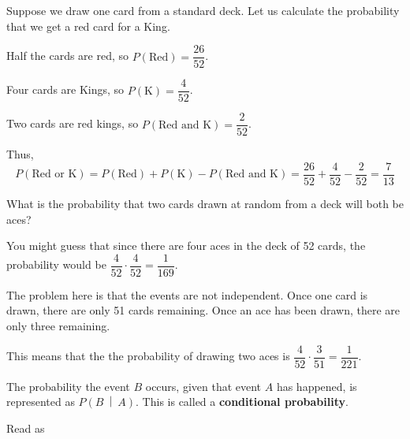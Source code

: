 \documentclass{beamer}
\newcommand{\prob}[1]{P\left(#1\right)}
\newcommand{\condprob}[2]{\prob{#1~\middle|~#2}}
\begin{document}
\begin{frame}
\begin{example}
Suppose we draw one card from a standard deck. Let us calculate the probability that we get a red card for a King.\pause

\vspace{2mm}
Half the cards are red, so $\prob{\text{Red}}=\dfrac{26}{52}$.\pause

\vspace{2mm}
Four cards are Kings, so $\prob{\text{K}}=\dfrac{4}{52}$.\pause

\vspace{2mm}
Two cards are red kings, so $\prob{\text{Red and K}}=\dfrac{2}{52}$.\pause

\vspace{2mm}
Thus,
\begin{equation*}
\prob{\text{Red or K}} 
= \prob{\text{Red}} + \prob{\text{K}} - \prob{\text{Red and K}}
= \dfrac{26}{52} + \dfrac{4}{52} - \dfrac{2}{52}
= \dfrac{7}{13}
\end{equation*}
\end{example}
\end{frame}

\begin{frame}
\begin{example}
What is the probability that two cards drawn at random from a deck will both be aces?\pause

\vspace{2mm}
You might guess that since there are four aces in the deck of 52 cards, the probability would be $\dfrac{4}{52}\cdot\dfrac{4}{52}=\dfrac{1}{169}$.\pause

\vspace{2mm}
The problem here is that the events are not independent. Once one card is drawn, there are only 51 cards remaining. Once an ace has been drawn, there are only three remaining.\pause

\vspace{2mm}
This means that the the probability of drawing two aces is $\dfrac{4}{52}\cdot\dfrac{3}{51}=\dfrac{1}{221}$.
\end{example}\pause

\begin{definition}
The probability the event $B$ occurs, given that event $A$ has happened, is represented as $\condprob{B}{A}$. This is called a \textbf{conditional probability}.

\vspace{2mm}
Read as 
\end{definition}
\end{frame}
\end{document}
